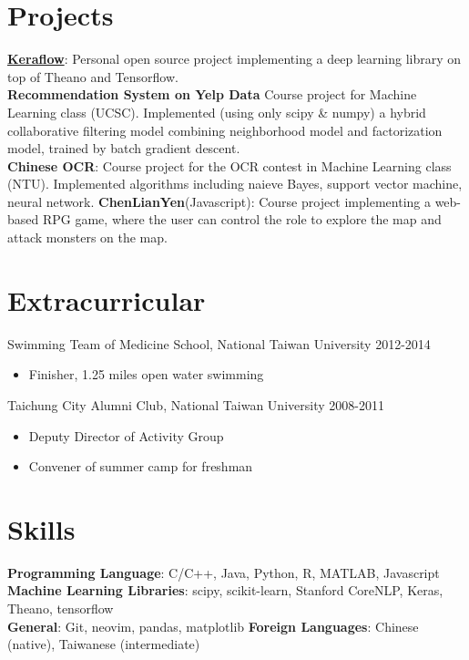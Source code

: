 \documentclass[a4paper,10pt]{article}
\begin{document}
\section{Projects}
\href{https://github.com/ipod825/keraflow}{\textbf{Keraflow}}: Personal open source project implementing a deep learning library on top of Theano and Tensorflow. \\
\textbf{Recommendation System on Yelp Data} Course project for Machine Learning class (UCSC). Implemented (using only scipy \& numpy) a hybrid collaborative filtering model combining neighborhood model and factorization model, trained by batch gradient descent. \\
\textbf{Chinese OCR}: Course project for the OCR contest in Machine Learning class (NTU). Implemented algorithms including naieve Bayes, support vector machine, neural network.
\textbf{ChenLianYen}(Javascript): Course project implementing a web-based RPG game, where the user can control the role to explore the map and attack monsters on the map.


\section{Extracurricular}
Swimming Team of Medicine School, National Taiwan University \hfill 2012-2014
\begin{itemize}
    \item Finisher, 1.25 miles open water swimming
\end{itemize}

Taichung City Alumni Club, National Taiwan University \hfill 2008-2011
\begin{itemize}
    \item Deputy Director of Activity Group
    \item Convener of summer camp for freshman
\end{itemize}

\section{Skills}
\textbf{Programming Language}: C/C++, Java, Python, R, MATLAB, Javascript \\
\textbf{Machine Learning Libraries}: scipy, scikit-learn, Stanford CoreNLP, Keras, Theano, tensorflow \\
\textbf{General}: Git, neovim, pandas, matplotlib 
\textbf{Foreign Languages}: Chinese (native), Taiwanese (intermediate)
\end{document}
